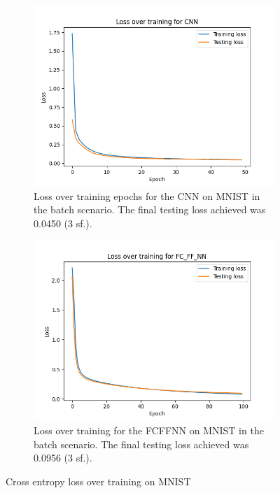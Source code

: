 \begin{figure}[htbp]
    \centering
    \begin{subfigure}[t]{0.45\linewidth}
      \centering
      \includegraphics[width=\textwidth]{images/MNIST/CNN_loss.png}
      \caption{Loss over training epochs for the CNN on MNIST in the batch scenario. The final testing loss achieved was 0.0450 (3 sf.).}
      \label{fig:MNIST-Batch-CNN-loss}
    \end{subfigure}
    \hspace{0.5cm}
    \begin{subfigure}[t]{0.45\linewidth}
      \centering
      \includegraphics[width=\textwidth]{images/MNIST/FC_FF_NN_loss.png}
      \caption{Loss over training for the FCFFNN on MNIST in the batch scenario. The final testing loss achieved was 0.0956 (3 sf.).}
      \label{fig:MNIST-Batch-FCFFNN-loss}
    \end{subfigure}
    \caption{Cross entropy loss over training on MNIST}
    \label{fig:MNIST-Batch-loss}
\end{figure}

